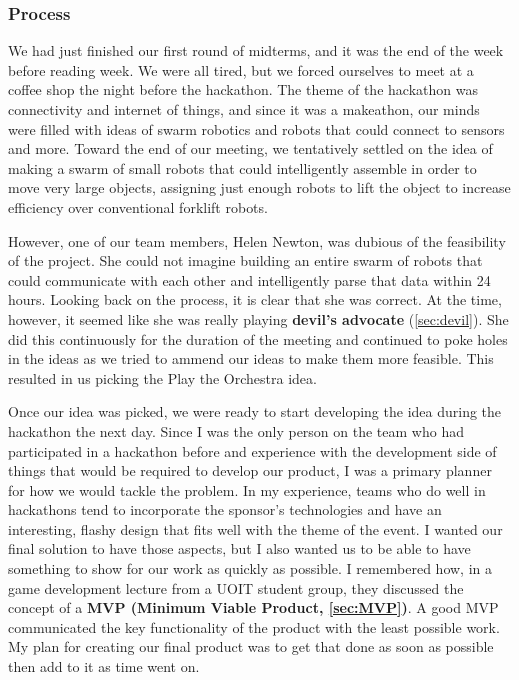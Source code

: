 \documentclass[a4paper,12pt]{article}
\begin{document}
\subsubsection{Process}
We had just finished our first round of midterms, and it was the end of the week before reading week. We were all tired, but we forced ourselves to meet at a coffee shop the night before the hackathon. The theme of the hackathon was connectivity and internet of things, and since it was a makeathon, our minds were filled with ideas of swarm robotics and robots that could connect to sensors and more. Toward the end of our meeting, we tentatively settled on the idea of making a swarm of small robots that could intelligently assemble in order to move very large objects, assigning just enough robots to lift the object to increase efficiency over conventional forklift robots.

However, one of our team members, Helen Newton, was dubious of the feasibility of the project. She could not imagine building an entire swarm of robots that could communicate with each other and intelligently parse that data within 24 hours. Looking back on the process, it is clear that she was correct. At the time, however, it seemed like she was really playing \textbf{devil’s advocate} (\ref{sec:devil}). She did this continuously for the duration of the meeting and continued to poke holes in the ideas as we tried to ammend our ideas to make them more feasible. This resulted in us picking the Play the Orchestra idea.

Once our idea was picked, we were ready to start developing the idea during the hackathon the next day. Since I was the only person on the team who had participated in a hackathon before and experience with the development side of things that would be required to develop our product, I was a primary planner for how we would tackle the problem. In my experience, teams who do well in hackathons tend to incorporate the sponsor’s technologies and have an interesting, flashy design that fits well with the theme of the event. I wanted our final solution to have those aspects, but I also wanted us to be able to have something to show for our work as quickly as possible. I remembered how, in a game development lecture from a UOIT student group, they discussed the concept of a \textbf{MVP (Minimum Viable Product, \ref{sec:MVP})}. A good MVP communicated the key functionality of the product with the least possible work. My plan for creating our final product was to get that done as soon as possible then add to it as time went on.
\end{document}
